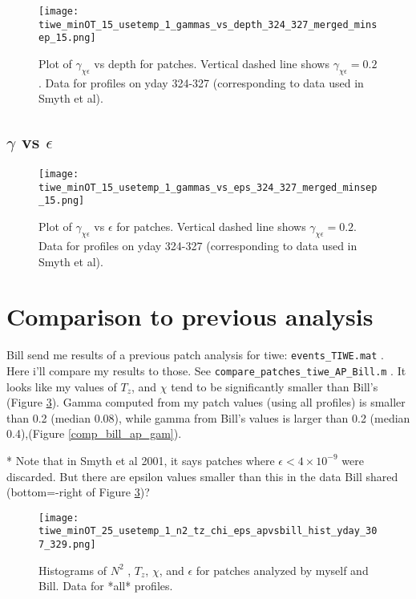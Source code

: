 \documentclass[11pt]{article}
\begin{document}
\begin{figure}[htbp]
\texttt{[image: tiwe\_minOT\_15\_usetemp\_1\_gammas\_vs\_depth\_324\_327\_merged\_minsep\_15.png]}
\caption{Plot of $\gamma_{\chi\epsilon}$ vs depth for patches. Vertical dashed line shows $\gamma_{\chi\epsilon}=0.2$. Data for profiles on yday 324-327 (corresponding to data used in Smyth et al).}
\label{patch_gam_vs_depth}
\end{figure}



\subsection{$\gamma$ vs $\epsilon$}


\begin{figure}[htbp]
\texttt{[image: tiwe\_minOT\_15\_usetemp\_1\_gammas\_vs\_eps\_324\_327\_merged\_minsep\_15.png]}
\caption{Plot of $\gamma_{\chi\epsilon}$ vs $\epsilon$ for patches. Vertical dashed line shows $\gamma_{\chi\epsilon}=0.2$. Data for profiles on yday 324-327 (corresponding to data used in Smyth et al).}
\label{patch_gam_vs_eps}
\end{figure}





\clearpage
\section{Comparison to previous analysis}

Bill send me results of a previous patch analysis for tiwe: \verb+events_TIWE.mat+ . Here i'll compare my results to those. See \verb+compare_patches_tiwe_AP_Bill.m+ . It looks like my values of $T_z$, and $\chi$ tend to be significantly smaller than Bill's (Figure \ref{comp_bill_ap_1}). Gamma computed from my patch values (using all profiles) is smaller than 0.2 (median 0.08), while gamma from Bill's values is larger than 0.2 (median 0.4),(Figure \ref{comp_bill_ap_gam}).

* Note that in Smyth et al 2001, it says patches where $\epsilon < 4 \times 10^{-9}$ were discarded. But there are epsilon values smaller than this in the data Bill shared (bottom=-right of Figure \ref{comp_bill_ap_1})?

\begin{figure}[htbp]
\texttt{[image: tiwe\_minOT\_25\_usetemp\_1\_n2\_tz\_chi\_eps\_apvsbill\_hist\_yday\_307\_329.png]}
\caption{Histograms of $N^2$ , $T_z$, $\chi$, and $\epsilon$ for patches analyzed by myself and Bill. Data for *all* profiles.}
\label{comp_bill_ap_1}
\end{figure}
%
\end{document}
